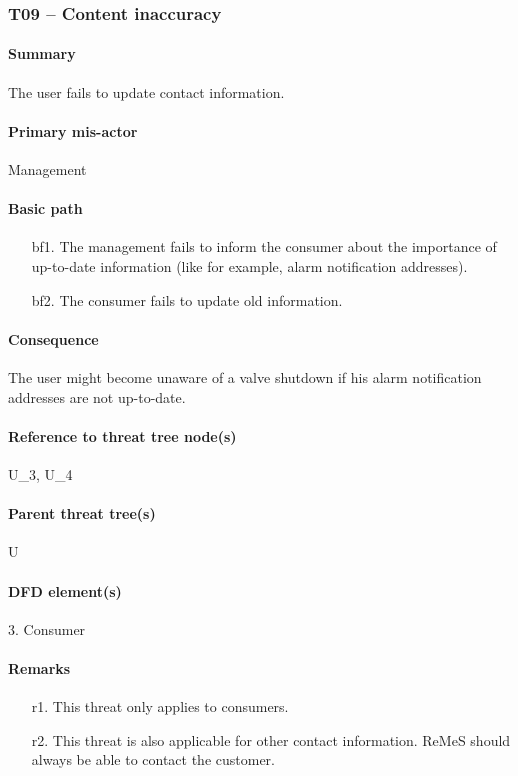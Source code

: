 \subsubsection{T09 -- Content inaccuracy} 

\paragraph{Summary} The user fails to update contact information. 

\paragraph{Primary mis-actor} Management

\paragraph{Basic path}
\begin{enumerate}
	\item[bf1.] The management fails to inform the consumer about the importance of
	up-to-date information (like for example, alarm notification addresses).
    \item[bf2.] The consumer fails to update old information.
\end{enumerate}

\paragraph{Consequence} The user might become unaware of a valve shutdown if his
alarm notification addresses are not up-to-date.

\paragraph{Reference to threat tree node(s)} U\_3, U\_4

\paragraph{Parent threat tree(s)} U

\paragraph{DFD element(s)} 3. Consumer

\paragraph{Remarks}
\begin{enumerate}
     \item[r1.] This threat only applies to consumers.
     \item[r2.] This threat is also applicable for other contact information.
     ReMeS should always be able to contact the customer.
\end{enumerate}
